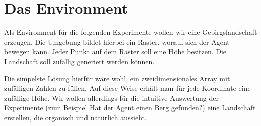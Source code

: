 \section{Das Environment}

Als Environment für die folgenden Experimente wollen wir eine Gebirgslandschaft erzeugen. Die Umgebung bildet hierbei ein Raster, worauf sich der Agent bewegen kann. Jeder Punkt auf dem Raster soll eine Höhe besitzen. Die Landschaft soll zufällig generiert werden können.

Die simpelste Lösung hierfür wäre wohl, ein zweidimensionales Array mit zufälligen Zahlen zu füllen. Auf diese Weise erhält man für jede Koordinate eine zufällige Höhe. Wir wollen allerdings für die intuitive Auswertung der Experimente (zum Beispiel \glqq Hat der Agent einen Berg gefunden?\grqq) eine Landschaft erstellen, die organisch und natürlich aussieht.

